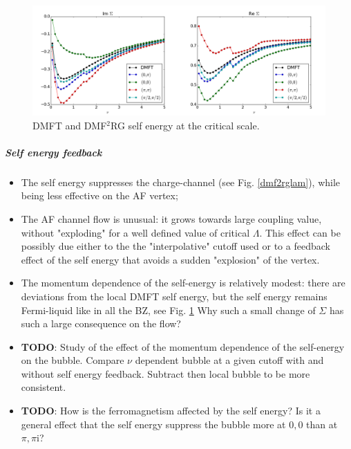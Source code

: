 \begin{figure}
\includegraphics[scale=0.25]{images/Merged_dmf2rg_se_freq.png}
\caption{DMFT and DMF$^2$RG self energy at the critical scale.} \label{dmf2self}
\end{figure}



\subparagraph{Self energy feedback}
\begin{itemize}
\item The self energy suppresses the charge-channel (see Fig. \ref{dmf2rglam}), while being less effective on the AF vertex; 
\item 	The AF channel flow is unusual: it grows towards large coupling value, without "exploding" for a well defined value of critical $\Lambda$. This effect can be possibly due either to the the "interpolative" cutoff used or to a feedback effect of the self energy that avoids a sudden "explosion" of the vertex. 
\item The momentum dependence of the self-energy is relatively modest: there are deviations from the local DMFT self energy, but the self energy remains Fermi-liquid like in all the BZ, see Fig. \ref{dmf2self} Why such a small change of $\Sigma$ has such a large consequence on the flow? 

\item \textbf{TODO}: Study of the effect of the momentum dependence of the self-energy on the bubble. Compare $\nu$ dependent bubble at a given cutoff with and without self energy feedback. Subtract then local bubble to be more consistent. 
\item \textbf{TODO}: How is the ferromagnetism affected by the self energy? Is it a general effect that the self energy suppress the bubble more at $0,0$ than at $\pi,\pi$i? 
\end{itemize} 


